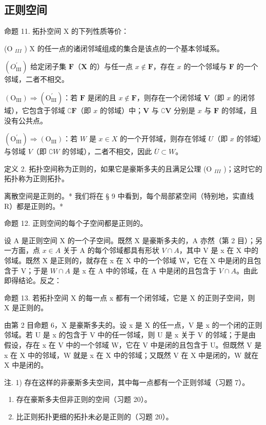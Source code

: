 \subsection{正则空间}

命题 11. 拓扑空间 X 的下列性质等价：

(O \(_{III}\) ) X 的任一点的诸闭邻域组成的集合是该点的一个基本邻域系。

\((O_{\mathrm{III}}^{\prime})\) 给定闭子集 \(\mathbf{F}\)（\(\mathbf{X}\) 的）与任一点 \(x \notin \mathbf{F}\)，存在 \(x\) 的一个邻域与 \(\mathbf{F}\) 的一个邻域，二者不相交。

\((\mathrm{O}_{\mathrm{III}}) \Longrightarrow (\mathrm{O}_{\mathrm{III}}^{\prime})\)：若 \(\mathbf{F}\) 是闭的且 \(x \notin \mathbf{F}\)，则存在一个闭邻域 \(\mathbf{V}\)（即 \(x\) 的闭邻域），它包含于邻域 \(\complement \mathbf{F}\)（即 \(x\) 的邻域）中；\(\mathbf{V}\) 与 \(\complement \mathbf{V}\) 分别是 \(x\) 与 \(\mathbf{F}\) 的邻域，且没有公共点。

\((\mathrm{O}_{\mathrm{III}}^{\prime}) \Longrightarrow (\mathrm{O}_{\mathrm{III}})\)：若 \(W\) 是 \(x \in X\) 的一个开邻域，则存在邻域 \(U\)（即 \(x\) 的邻域）与邻域 \(V\)（即 \(\complement W\) 的邻域），二者不相交，因此 \(\overline{U} \subset W\)。

定义 2. 拓扑空间称为正则的，如果它是豪斯多夫的且满足公理 (O \(_{III}\) )；这时它的拓扑称为正则拓扑。

离散空间是正则的。* 我们将在 § 9 中看到，每个局部紧空间（特别地，实直线 R）都是正则的。*

命题 12. 正则空间的每个子空间都是正则的。

设 A 是正则空间 X 的一个子空间。既然 X 是豪斯多夫的，A 亦然（第 2 目）；另一方面，点 \(x \in A\) 关于 A 的每个邻域都具有形状 \(V \cap A\)，其中 V 是 x 在 X 中的邻域。既然 X 是正则的，就存在 x 在 X 中的一个邻域 W，它在 X 中是闭的且包含于 V；于是 \(W \cap A\) 是 x 在 A 中的邻域，在 A 中是闭的且包含于 \(V \cap A\)。由此即得结论。反之：

命题 13. 若拓扑空间 X 的每一点 x 都有一个闭邻域，它是 X 的正则子空间，则 X 是正则的。

由第 2 目命题 6，X 是豪斯多夫的。设 x 是 X 的任一点，V 是 x 的一个闭的正则邻域。若 U 是 x 的包含于 V 中的任一邻域，则 U 是 x 关于 V 的邻域；于是由假设，存在 x 在 V 中的一个邻域 W，它在 V 中是闭的且包含于 U。但既然 V 是 x 在 X 中的邻域，W 就是 x 在 X 中的邻域；又既然 V 在 X 中是闭的，W 就在 X 中是闭的。

注. 1) 存在这样的非豪斯多夫空间，其中每一点都有一个正则邻域（习题 7）。

\begin{enumerate}
\def\labelenumi{\arabic{enumi})}
\setcounter{enumi}{1}
\item
  存在豪斯多夫但非正则的空间（习题 20）。
\item
  比正则拓扑更细的拓扑未必是正则的（习题 20）。
\end{enumerate}

